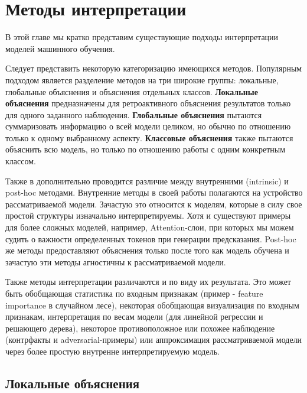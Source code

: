 \chapter{Методы интерпретации}

В этой главе мы кратко представим существующие подходы интерпретации моделей машинного обучения.

Следует представить некоторую категоризацию имеющихся методов. Популярным подходом является разделение методов на три широкие группы: локальные, глобальные объяснения и объяснения отдельных классов. \textbf{Локальные объяснения} предназначены для ретроактивного объяснения результатов только для одного заданного наблюдения. \textbf{Глобальные объяснения} пытаются суммаризовать информацию о всей модели целиком, но обычно по отношению только к одному выбранному аспекту. \textbf{Классовые объяснения} также пытаются объяснить всю модель, но только по отношению работы с одним конкретным классом.

Также в \cite{madsenPosthocInterpretabilityNeural2021} дополнительно проводится различие между внутренними (intrinsic) и post-hoc методами. Внутренние методы в своей работы полагаются на устройство рассматриваемой модели. Зачастую это относится к моделям, которые в силу свое простой структуры изначально интерпретируемы. Хотя и существуют примеры для более сложных моделей, например, Attention-слои, при которых мы можем судить о важности определенных токенов при генерации предсказания.
Post-hoc же методы предоставляют объяснения только после того как модель обучена и зачастую эти методы агностичны к рассматриваемой модели.

Также методы интерпретации различаются и по виду их результата. Это может быть обобщающая статистика по входным признакам (пример - feature importance в случайном лесе), некоторая обобщающая визуализация по входным признакам, интерпретация по весам модели (для линейной регрессии и решающего дерева), некоторое противоположное или похожее наблюдение (контрфакты и adversarial-примеры) или аппроксимация рассматриваемой модели через более простую внутренне интерпретируемую модель.



\vspace{15mm}
\section{Локальные объяснения}

